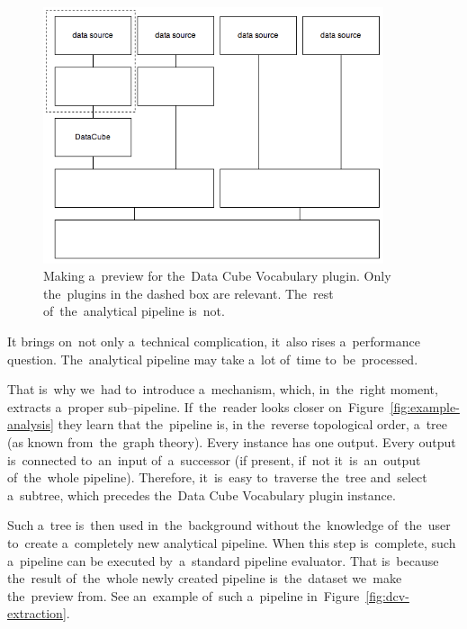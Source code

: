 \begin{figure}
	\centering
	\includegraphics[width=100mm]{img/dcv-preview-useful.png}
	\caption{Making a~preview for the~Data Cube Vocabulary plugin. Only the~plugins in
	the dashed box are relevant. The~rest of~the~analytical pipeline is~not.}
	\label{fig:dcv-preview-useful}
\end{figure}

It brings on~not only a~technical complication, it~also rises a~performance 
question. The~analytical pipeline may take a~lot of~time to~be~processed.

That is~why we~had to~introduce a~mechanism, which, in~the~right moment, 
extracts a~proper sub--pipeline. If~the~reader looks closer on~Figure~\ref{fig:example-analysis} they learn that the~pipeline is,
in the~reverse topological order, 
a~tree (as known from~the~graph theory). Every instance has 
one output. Every output is~connected to~an~input of~a~successor (if present, if~not it~is~an~output
of~the~whole pipeline). Therefore, it~is~easy to~traverse the~tree and~select a~subtree, which precedes the~Data Cube Vocabulary plugin instance.

Such a~tree is~then used in~the~background without the~knowledge of~the~user to~create a~completely new analytical pipeline. When this step is~complete, such a~pipeline can 
be executed by~a~standard pipeline evaluator. That is~because the~result of~the~whole 
newly created pipeline is~the~dataset we~make the~preview from.
See an~example of~such a~pipeline in~Figure~\ref{fig:dcv-extraction}.

